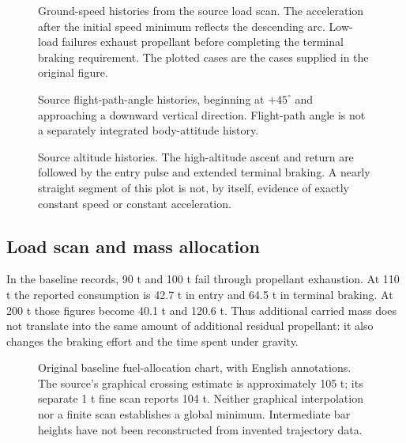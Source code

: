 \documentclass[11pt,a4paper]{article}
\begin{document}
\begin{figure}[htbp]
\centering{}
\caption{Ground-speed histories from the source load scan. The acceleration after the initial speed minimum reflects the descending arc. Low-load failures exhaust propellant before completing the terminal braking requirement. The plotted cases are the cases supplied in the original figure.}
\label{fig:speed}
\end{figure}

\begin{figure}[htbp]
\centering{}
\caption{Source flight-path-angle histories, beginning at $+45^\circ$ and approaching a downward vertical direction. Flight-path angle is not a separately integrated body-attitude history.}
\label{fig:gamma}
\end{figure}

\begin{figure}[htbp]
\centering{}
\caption{Source altitude histories. The high-altitude ascent and return are followed by the entry pulse and extended terminal braking. A nearly straight segment of this plot is not, by itself, evidence of exactly constant speed or constant acceleration.}
\label{fig:height}
\end{figure}

\subsection{Load scan and mass allocation}


In the baseline records, 90 t and 100 t fail through propellant exhaustion. At 110 t the reported consumption is 42.7 t in entry and 64.5 t in terminal braking. At 200 t those figures become 40.1 t and 120.6 t. Thus additional carried mass does not translate into the same amount of additional residual propellant: it also changes the braking effort and the time spent under gravity.

\begin{figure}[htbp]
\centering\SourceFuelPlot
\caption{Original baseline fuel-allocation chart, with English annotations. The source's graphical crossing estimate is approximately 105 t; its separate 1 t fine scan reports 104 t. Neither graphical interpolation nor a finite scan establishes a global minimum. Intermediate bar heights have not been reconstructed from invented trajectory data.}
\label{fig:fuel}
\end{figure}
\end{document}
